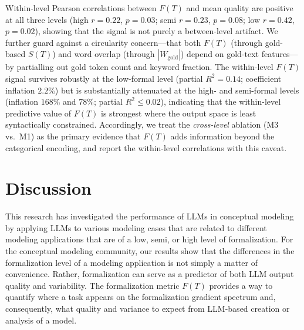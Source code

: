 \documentclass[runningheads]{llncs}
\begin{document}
Within-level Pearson correlations between $F(T)$ and mean quality are positive at all three levels (high $r=0.22$, $p=0.03$; semi $r=0.23$, $p=0.08$; low $r=0.42$, $p=0.02$), showing that the signal is not purely a between-level artifact. We further guard against a circularity concern---that both $F(T)$ (through gold-based $S(T)$) and word overlap (through $|W_{\text{gold}}|$) depend on gold-text features---by partialling out gold token count and keyword fraction. The within-level $F(T)$ signal survives robustly at the low-formal level (partial $R^2=0.14$; coefficient inflation $2.2\%$) but is substantially attenuated at the high- and semi-formal levels (inflation $168\%$ and $78\%$; partial $R^2 \leq 0.02$), indicating that the within-level predictive value of $F(T)$ is strongest where the output space is least syntactically constrained. Accordingly, we treat the \emph{cross-level} ablation (M3 vs.\ M1) as the primary evidence that $F(T)$ adds information beyond the categorical encoding, and report the within-level correlations with this caveat.

\section{Discussion}
\label{sec:discussion}

This research has investigated the performance of LLMs in conceptual modeling by applying LLMs to various modeling cases that are related to different modeling applications that are of a low, semi, or high level of formalization. 
%
%
For the conceptual modeling community, our results show that the differences in the formalization level of a modeling application
is not simply a matter of convenience. Rather, formalization can serve as a predictor of both LLM output quality and variability. The formalization metric $F(T)$  provides a way to quantify where a task appears on the formalization gradient spectrum and, consequently, what quality and variance 
to expect from LLM-based creation or analysis of a model.
\end{document}
